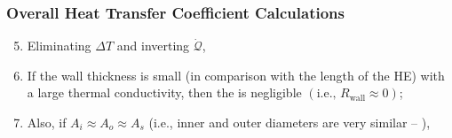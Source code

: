 \documentclass[10pt,compress,unknownkeysallowed]{beamer}
\begin{document}
\begin{frame}
  \frametitle{Overall Heat Transfer Coefficient Calculations}
     \begin{enumerate}\setcounter{enumi}{4}%
        \item<1-> Eliminating $\Delta T$ and inverting $\dot{\mathcal{Q}}$,
        \item<2-> If the wall thickness is small (in comparison with the length of the HE) with a large thermal conductivity, then the  is negligible $\left(\text{i.e., }R_{\text{wall}} \approx 0\right)$;
        \item<3-> Also, if $A_{i}\approx A_{o} \approx A_{s}$ (i.e., inner and outer diameters are very similar -- ),
     \end{enumerate}

\end{frame}
\end{document}

